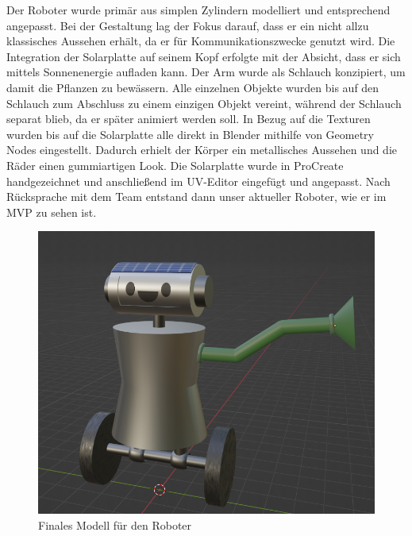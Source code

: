 Der Roboter wurde primär aus simplen Zylindern modelliert und entsprechend angepasst. Bei der Gestaltung lag der Fokus darauf, dass er ein nicht allzu klassisches Aussehen erhält, da er für Kommunikationszwecke genutzt wird. Die Integration der Solarplatte auf seinem Kopf erfolgte mit der Absicht, dass er sich mittels Sonnenenergie aufladen kann. Der Arm wurde als Schlauch konzipiert, um damit die Pflanzen zu bewässern. Alle einzelnen Objekte wurden bis auf den Schlauch zum Abschluss zu einem einzigen Objekt vereint, während der Schlauch separat blieb, da er später animiert werden soll. In Bezug auf die Texturen wurden bis auf die Solarplatte alle direkt in Blender mithilfe von Geometry Nodes eingestellt. Dadurch erhielt der Körper ein metallisches Aussehen und die Räder einen gummiartigen Look. Die Solarplatte wurde in ProCreate handgezeichnet und anschließend im UV-Editor eingefügt und angepasst. Nach Rücksprache mit dem Team entstand dann unser aktueller Roboter, wie er im MVP zu sehen ist.
\begin{figure}[h]
	\centering
	\includegraphics[height=0.3\pageheight,keepaspectratio]{pics/10}
	\caption{Finales Modell für den Roboter}
\end{figure}
\par
